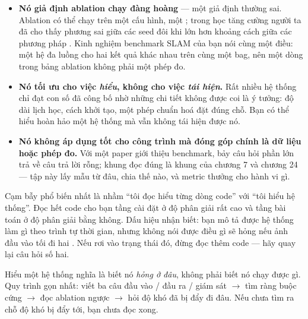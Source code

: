 \documentclass[../../deep_learning.tex]{subfiles}
\begin{document}
\begin{itemize}
\item \textbf{Nó giả định ablation chạy đàng hoàng} --- một giả định thường sai. Ablation có thể chạy trên một cấu hình, một ; trong học tăng cường người ta đã cho thấy phương sai giữa các seed đôi khi lớn hơn khoảng cách giữa các phương pháp \cite{henderson2018deep}. Kinh nghiệm benchmark SLAM của bạn nói cùng một điều: một hệ đa luồng cho hai kết quả khác nhau trên cùng một bag, nên một dòng trong bảng ablation không phải một phép đo.
\item \textbf{Nó tối ưu cho việc \emph{hiểu}, không cho việc \emph{tái hiện}.} Rất nhiều hệ thống chỉ đạt con số đã công bố nhờ những chi tiết không được coi là ý tưởng: độ dài lịch học, cách khởi tạo, một phép chuẩn hoá đặt đúng chỗ. Bạn có thể hiểu hoàn hảo một hệ thống mà vẫn không tái hiện được nó.
\item \textbf{Nó không áp dụng tốt cho công trình mà đóng góp chính là dữ liệu hoặc phép đo.} Với một paper giới thiệu benchmark, bảy câu hỏi phần lớn trả về câu trả lời rỗng; khung đọc đúng là khung của chương 7 và chương 24 --- tập này lấy mẫu từ đâu, chia thế nào, và metric thưởng cho hành vi gì.
\end{itemize}

\begin{cambay}
Cạm bẫy phổ biến nhất là nhầm ``tôi đọc hiểu từng dòng code'' với ``tôi hiểu hệ thống''. Đọc hết code cho bạn tầng cài đặt ở độ phân giải rất cao và tầng bài toán ở độ phân giải bằng không. Dấu hiệu nhận biết: bạn mô tả được hệ thống làm gì theo trình tự thời gian, nhưng không nói được điều gì sẽ hỏng nếu ảnh đầu vào tối đi hai . Nếu rơi vào trạng thái đó, đừng đọc thêm code --- hãy quay lại câu hỏi số hai.
\end{cambay}

\begin{cannho}
Hiểu một hệ thống nghĩa là biết nó \emph{hỏng ở đâu}, không phải biết nó chạy được gì. Quy trình gọn nhất: viết ba câu đầu vào / đầu ra / giám sát \(\rightarrow\) tìm ràng buộc cứng \(\rightarrow\) đọc ablation ngược \(\rightarrow\) hỏi độ khó đã bị đẩy đi đâu. Nếu chưa tìm ra chỗ độ khó bị đẩy tới, bạn chưa đọc xong. 
\end{cannho}
\end{document}
